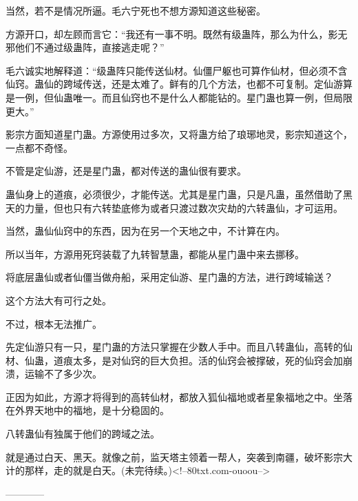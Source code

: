 \begin{this_body}
当然，若不是情况所逼。毛六宁死也不想方源知道这些秘密。

方源开口，却左顾而言它：“我还有一事不明。既然有级蛊阵，那么为什么，影无邪他们不通过级蛊阵，直接逃走呢？”

毛六诚实地解释道：“级蛊阵只能传送仙材。仙僵尸躯也可算作仙材，但必须不含仙窍。蛊仙的跨域传送，还是太难了。鲜有的几个方法，也都不可复制。定仙游算是一例，但仙蛊唯一。而且仙窍也不是什么人都能钻的。星门蛊也算一例，但局限更大。”

影宗方面知道星门蛊。方源使用过多次，又将蛊方给了琅琊地灵，影宗知道这个，一点都不奇怪。

不管是定仙游，还是星门蛊，都对传送的蛊仙很有要求。

蛊仙身上的道痕，必须很少，才能传送。尤其是星门蛊，只是凡蛊，虽然借助了黑天的力量，但也只有六转垫底修为或者只渡过数次灾劫的六转蛊仙，才可运用。

当然，蛊仙仙窍中的东西，因为在另一个天地之中，不计算在内。

所以当年，方源用死窍装载了九转智慧蛊，都能从星门蛊中来去挪移。

将底层蛊仙或者仙僵当做舟船，采用定仙游、星门蛊的方法，进行跨域输送？

这个方法大有可行之处。

不过，根本无法推广。

先定仙游只有一只，星门蛊的方法只掌握在少数人手中。而且八转蛊仙，高转的仙材、仙蛊，道痕太多，是对仙窍的巨大负担。活的仙窍会被撑破，死的仙窍会加崩溃，运输不了多少次。

正因为如此，方源才将得到的高转仙材，都放入狐仙福地或者星象福地之中。坐落在外界天地中的福地，是十分稳固的。

八转蛊仙有独属于他们的跨域之法。

就是通过白天、黑天。就像之前，监天塔主领着一帮人，突袭到南疆，破坏影宗大计的那样，走的就是白天。(未完待续。)<!--80txt.com-ouoou-->

------------

\end{this_body}

